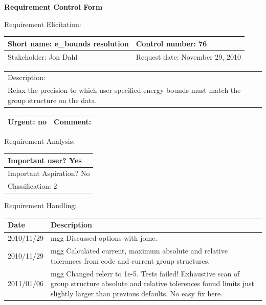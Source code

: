 \begin{center}\Large\bf
Requirement Control Form
\end{center}
\vspace{24pt}

Requirement Elicitation:

\begin{tabular}{|p{211pt}|p{211pt}|} \hline
Short name: e_bounds resolution & Control number: 76\\ \hline
Stakeholder: Jon Dahl & Request date: November 29, 2010\\
\end{tabular}
\begin{tabular}{|p{433pt}|} \hline
Description: \\ 
Relax the precision to which user specified energy bounds must match
the group structure on the data.\\ \hline
\end{tabular} 
\begin{tabular}{|p{211pt}|p{211pt}|} \hline
Urgent: no & Comment:
\\ \hline
\end{tabular}

\vspace{24pt}

Requirement Analysis:

\begin{tabular}{|p{433pt}|} \hline
Important user? Yes \\ \hline
Important Aspiration? No \\ \hline
Classification: 2 \\ \hline
\end{tabular}

\vspace{24pt}

Requirement Handling:

\begin{tabular}{|p{72pt}|p{351pt}|} \hline
Date & Description \\ \hline
2010/11/29 & mgg Discussed options with jomc.\\ \hline
2010/11/29 & mgg Calculated current, maximum absolute and relative
tolerances from code and current group structures.\\ \hline
2011/01/06 & mgg Changed relerr to 1e-5.  Tests failed!  Exhaustive
scan of group structure absolute and relative tolerences found limits
just slightly larger than previous defaults.  No easy fix here. \\ \hline 
\end{tabular}
